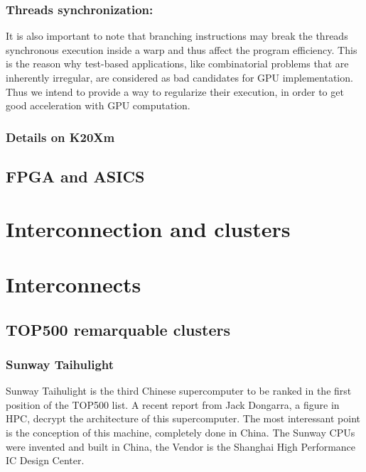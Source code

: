 \subsubsection{Threads synchronization:}
It is also important to note that branching instructions may break the threads synchronous execution inside a warp and thus affect the program efficiency. 
This is the reason why test-based applications, like combinatorial problems that are inherently irregular, are considered as bad candidates for GPU implementation. 
Thus we intend to provide a way to regularize their execution, in order to get good acceleration with GPU computation. 

\subsubsection{Details on K20Xm}


\subsection{FPGA and ASICS}

\section{Interconnection and clusters}

\section{Interconnects}


\subsection{TOP500 remarquable clusters}
\subsubsection{Sunway Taihulight}

Sunway Taihulight is the third Chinese supercomputer to be ranked in the first position of the TOP500 list. 
A recent report from Jack Dongarra, a figure in HPC, decrypt the architecture of this supercomputer\cite{dongarra2016report}. 
The most interessant point is the conception of this machine, completely done in China. 
The Sunway CPUs were invented and built in China, the Vendor is the Shanghai High Performance IC Design Center. 


